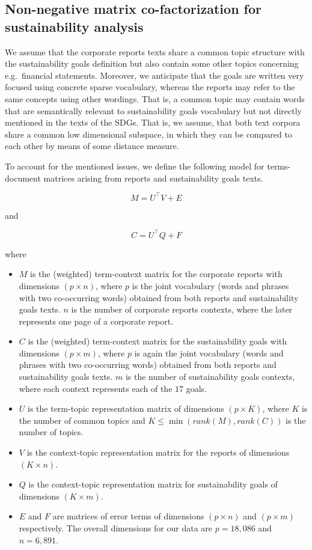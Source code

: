 \documentclass[
]{article}
\providecommand{\tightlist}{%
  \setlength{\itemsep}{0pt}\setlength{\parskip}{0pt}}
\begin{document}
\hypertarget{non-negative-matrix-co-factorization-for-sustainability-analysis}{%
\subsection{Non-negative matrix co-factorization for sustainability analysis}\label{non-negative-matrix-co-factorization-for-sustainability-analysis}}

We assume that the corporate reports texts share a common topic structure with the sustainability goals definition but also contain some other topics concerning e.g.~financial statements. Moreover, we anticipate that the goals are written very focused using concrete sparse vocabulary, whereas the reports may refer to the same concepts using other wordings. That is, a common topic may contain words that are semantically relevant to sustainability goals vocabulary but not directly mentioned in the texts of the SDGs.
That is, we assume, that both text corpora share a common low dimensional subspace, in which they can be compared to each other by means of some distance measure.

To account for the mentioned issues, we define the following model for terms-document matrices arising from reports and sustainability goals texts.

\[M = U^\top V + E\]

and

\[C = U^\top Q + F\]

where

\begin{itemize}
\tightlist
\item
  \(M\) is the (weighted) term-context matrix for the corporate reports with dimensions \((p\times n)\), where \(p\) is the joint vocabulary (words and phrases with two co-occurring words) obtained from both reports and sustainability goals texts. \(n\) is the number of corporate reports contexts, where the later represents one page of a corporate report.
\item
  \(C\) is the (weighted) term-context matrix for the sustainability goals with dimensions \((p\times m)\), where \(p\) is again the joint vocabulary (words and phrases with two co-occurring words) obtained from both reports and sustainability goals texts. \(m\) is the number of sustainability goals contexts, where each context represents each of the \(17\) goals.
\item
  \(U\) is the term-topic representation matrix of dimensions \((p\times K)\), where \(K\) is the number of common topics and \(K\leq \min(rank(M),rank(C))\) is the number of topics.
\item
  \(V\) is the context-topic representation matrix for the reports of dimensions \((K\times n)\).
\item
  \(Q\) is the context-topic representation matrix for sustainability goals of dimensions \((K\times m)\).
\item
  \(E\) and \(F\) are matrices of error terms of dimensions \((p\times n)\) and \((p\times m)\) respectively.
  The overall dimensions for our data are \(p=18,086\) and \(n=6,891\).
\end{itemize}
\end{document}

